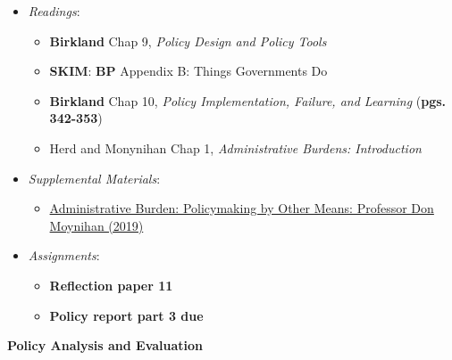 \begin{itemize}

\item
  \emph{Readings}:

  \begin{itemize}
  
  \item
    \textbf{Birkland} Chap 9, \emph{Policy Design and Policy Tools}
  \item
    \textbf{SKIM}: \textbf{BP} Appendix B: Things Governments Do
  \item
    \textbf{Birkland} Chap 10, \emph{Policy Implementation, Failure, and
    Learning} (\textbf{pgs. 342-353})
  \item
    Herd and Monynihan Chap 1, \emph{Administrative Burdens:
    Introduction}
  \end{itemize}
\item
  \emph{Supplemental Materials}:

  \begin{itemize}
  
  \item
    \faYoutube \hspace{0.005in}
    \href{https://youtu.be/Y4VqvfcRTec}{Administrative Burden:
    Policymaking by Other Means: Professor Don Moynihan (2019)}
  \end{itemize}
\item
  \emph{Assignments}:

  \begin{itemize}
  
  \item
    \textbf{Reflection paper 11}
  \item
    \textbf{Policy report part 3 due}
  \end{itemize}
\end{itemize}

\week \textbf{Policy Analysis and Evaluation}

